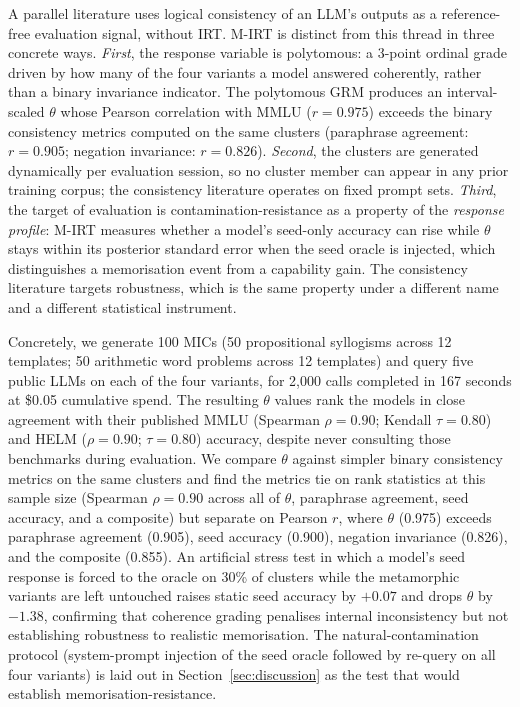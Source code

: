 \documentclass[11pt,letterpaper]{article}
\begin{document}
A parallel literature \citep{Elazar2021, Jang2022, Jang2023, Liu2024, Novikova2025, Zhang2026, Musawi2025} uses logical consistency of an LLM's outputs as a reference-free evaluation signal, without IRT. M-IRT is distinct from this thread in three concrete ways. \emph{First}, the response variable is polytomous: a 3-point ordinal grade driven by how many of the four variants a model answered coherently, rather than a binary invariance indicator. The polytomous GRM produces an interval-scaled $\theta$ whose Pearson correlation with MMLU ($r = 0.975$) exceeds the binary consistency metrics computed on the same clusters (paraphrase agreement: $r = 0.905$; negation invariance: $r = 0.826$). \emph{Second}, the clusters are generated dynamically per evaluation session, so no cluster member can appear in any prior training corpus; the consistency literature operates on fixed prompt sets. \emph{Third}, the target of evaluation is contamination-resistance as a property of the \emph{response profile}: M-IRT measures whether a model's seed-only accuracy can rise while $\theta$ stays within its posterior standard error when the seed oracle is injected, which distinguishes a memorisation event from a capability gain. The consistency literature targets robustness, which is the same property under a different name and a different statistical instrument.

Concretely, we generate 100 MICs (50 propositional syllogisms across 12 templates; 50 arithmetic word problems across 12 templates) and query five public LLMs on each of the four variants, for 2{,}000 calls completed in 167 seconds at \$0.05 cumulative spend. The resulting $\theta$ values rank the models in close agreement with their published MMLU (Spearman $\rho = 0.90$; Kendall $\tau = 0.80$) and HELM ($\rho = 0.90$; $\tau = 0.80$) accuracy, despite never consulting those benchmarks during evaluation. We compare $\theta$ against simpler binary consistency metrics on the same clusters and find the metrics tie on rank statistics at this sample size (Spearman $\rho = 0.90$ across all of $\theta$, paraphrase agreement, seed accuracy, and a composite) but separate on Pearson $r$, where $\theta$ (0.975) exceeds paraphrase agreement (0.905), seed accuracy (0.900), negation invariance (0.826), and the composite (0.855). An artificial stress test in which a model's seed response is forced to the oracle on 30\% of clusters while the metamorphic variants are left untouched raises static seed accuracy by $+0.07$ and drops $\theta$ by $-1.38$, confirming that coherence grading penalises internal inconsistency but not establishing robustness to realistic memorisation. The natural-contamination protocol (system-prompt injection of the seed oracle followed by re-query on all four variants) is laid out in Section~\ref{sec:discussion} as the test that would establish memorisation-resistance.
\end{document}
